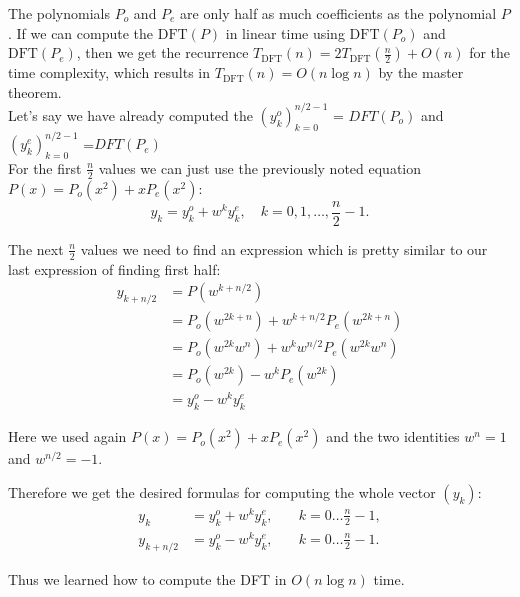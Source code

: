 \documentclass[28pt]{report}
\begin{document}
  
The polynomials $P_o$ and $P_e$ are only half as much coefficients as the polynomial $P$. If we can compute the $\text{DFT}(P)$ in linear time using $\text{DFT}(P_o)$ and $\text{DFT}(P_e)$, then we get the recurrence $T_{\text{DFT}}(n) = 2 T_{\text{DFT}}\left(\frac{n}{2}\right) + O(n)$ for the time complexity, which results in $T_{\text{DFT}}(n) = O(n \log n)$ by the master theorem.\\

Let's say we have already computed the $\left(y_k^o\right)_{k=0}^{n/2-1}$ = $DFT(P_o)$ and \\ $\left(y_k^e\right)_{k=0}^{n/2-1}$ =$DFT(P_e)$\\ 

For the first $\frac{n}{2}$ values we can just use the previously noted equation\\ $P(x) = P_o(x^2) + x P_e(x^2)$:
$$y_k = y_k^o + w^k y_k^e, \quad k = 0,1, \dots ,\frac{n}{2} - 1.$$

The next $\frac{n}{2}$ values we need to find an expression which is pretty similar to our last expression of finding first half:
\begin{align*} y_{k+n/2} &= P\left(w^{k+n/2}\right) \\ &= P_o\left(w^{2k+n}\right) + w^{k + n/2} P_e\left(w^{2k+n}\right) \\ &= P_o\left(w^{2k} w^n\right) + w^k w^{n/2} P_e\left(w^{2k} w^n\right) \\ &= P_o\left(w^{2k}\right) - w^k P_e\left(w^{2k}\right) \\ &= y_k^o - w^k y_k^e \end{align*}






Here we used again $P(x) = P_o(x^2) + x P_e(x^2)$ and the two identities $w^n = 1$ and $w^{n/2} = -1$.

Therefore we get the desired formulas for computing the whole vector $(y_k)$:
\begin{align*} y_k &= y_k^o + w^k y_k^e, &\quad k = 0 \dots \frac{n}{2} - 1, \\ y_{k+n/2} &= y_k^o - w^k y_k^e, &\quad k = 0 \dots \frac{n}{2} - 1. \end{align*}

Thus we learned how to compute the DFT in $O(n \log n)$ time.



        
               
\end{document}
